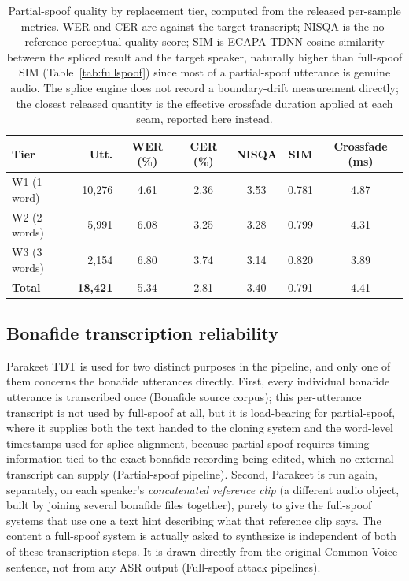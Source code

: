\documentclass[11pt]{article}
\begin{document}
\begin{table}[t]
\centering
\caption{Partial-spoof quality by replacement tier, computed from the
released per-sample metrics. WER and CER are against the target
transcript; NISQA is the no-reference perceptual-quality score; SIM is
ECAPA-TDNN cosine similarity between the spliced result and the target
speaker, naturally higher than full-spoof SIM (Table~\ref{tab:fullspoof})
since most of a partial-spoof utterance is genuine audio. The splice
engine does not record a boundary-drift measurement directly; the
closest released quantity is the effective crossfade duration applied at
each seam, reported here instead.}
\label{tab:pstierquality}
\small
\begin{tabular}{lrccccc}
\toprule
\textbf{Tier} & \textbf{Utt.} & \textbf{WER (\%)} & \textbf{CER (\%)} & \textbf{NISQA} & \textbf{SIM} & \textbf{Crossfade (ms)} \\
\midrule
W1 (1 word)  & 10{,}276 & 4.61 & 2.36 & 3.53 & 0.781 & 4.87 \\
W2 (2 words) &  5{,}991 & 6.08 & 3.25 & 3.28 & 0.799 & 4.31 \\
W3 (3 words) &  2{,}154 & 6.80 & 3.74 & 3.14 & 0.820 & 3.89 \\
\midrule
\textbf{Total} & \textbf{18{,}421} & 5.34 & 2.81 & 3.40 & 0.791 & 4.41 \\
\bottomrule
\end{tabular}
\end{table}

\subsection*{Bonafide transcription reliability}

Parakeet TDT is used for two distinct purposes in the pipeline, and only
one of them concerns the bonafide utterances directly. First, every
individual bonafide utterance is transcribed once (Bonafide source
corpus); this per-utterance transcript is not used by full-spoof at all,
but it is load-bearing for partial-spoof, where it supplies both the
text handed to the cloning system and the word-level timestamps used for
splice alignment, because partial-spoof requires timing information tied
to the exact bonafide recording being edited, which no external
transcript can supply (Partial-spoof pipeline). Second, Parakeet is run
again, separately, on each speaker's \emph{concatenated reference clip}
(a different audio object, built by joining several bonafide files
together), purely to give the full-spoof systems that use one a text
hint describing what that reference clip says. The content a full-spoof
system is actually asked to synthesize is independent of both of these
transcription steps. It is drawn directly from the original Common Voice
sentence, not from any ASR output (Full-spoof attack pipelines).
\end{document}
